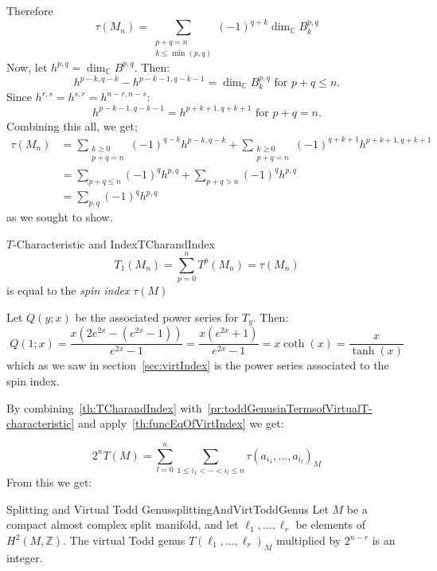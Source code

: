 \documentclass{ut-thesis}
\newenvironment{Proof}[1][]
  {\begin{ProofTcb}[#1]}
  {\end{ProofTcb}}
\begin{document}
\begin{Proof}
  Therefore
  \[
    \tau(M_n) = \sum_{\substack{p+q=n\\k\le \min(p,q)}} (-1)^{q+k} \dim_{\mathbb{C}} B_k^{p,q}
  \]
  Now, let $h^{p,q} = \dim_{\mathbb{C}} B^{p,q}$. Then:
  \[
      h^{p-k,q-k} - h^{p-k-1,q-k-1} = \dim_{\mathbb{C}} B_k^{p,q} \text{ for } p+q \leq n.
  \]
  Since $h^{r,s} = h^{s,r} = h^{n-r,n-s}$:
  \[
      h^{p-k-1,q-k-1} = h^{p+k+1,q+k+1} \text{ for } p+q=n.
  \]
  Combining this all, we get;
  \begin{align*}
    \tau(M_n) &= \sum_{\substack{k \geq 0 \\ p+q=n}} (-1)^{q-k}h^{p-k,q-k} + \sum_{\substack{k \geq 0 \\ p+q=n}} (-1)^{q+k+1}h^{p+k+1,q+k+1} \\
      &= \sum_{p+q \leq n} (-1)^qh^{p,q} + \sum_{p+q>n} (-1)^qh^{p,q} \\
      &= \sum_{p,q} (-1)^qh^{p,q}
  \end{align*}
  as we sought to show.
\end{Proof}

\begin{thm}{$T$-Characteristic and Index}{TCharandIndex}
\[
  T_{1}(M_n) = \sum_{p=0}^n  T^p(M_n) = \tau(M_n)
\]
is equal to the \emph{spin index} $\tau(M)$%
\end{thm}

\begin{Proof}
  Let $Q(y;x)$ be the associated power series for $T_y$. Then:
  \[
    Q(1;x) = \frac{x(2e^{2x} - (e^{2x} - 1))}{e^{2x} - 1} = \frac{x(e^{2x} + 1)}{e^{2x} - 1} = x\coth(x) = \frac{x}{\tanh(x)}
\]
which as we saw in section~\ref{sec:virtIndex} is the power series associated to the spin index.
\end{Proof}

By combining~\cref{th:TCharandIndex} with~\cref{pr:toddGenusinTermsofVirtualT-characteristic} and
apply~\cref{th:funcEqOfVirtIndex} we get:

\[
2^n T(M) = \sum_{l=0}^n \sum_{1\leq i_1<\cdots<i_l\leq n} \tau(a_{i_1},\ldots,a_{i_l})_M
\]
From this we get:

\begin{thm}{Splitting and Virtual Todd Genus}{splittingAndVirtToddGenus}
Let $M$ be a compact almost complex split manifold, and let $\ell_1,\ldots,\ell_r$ be elements of
$H^2(M,\mathbb{Z})$. The virtual Todd genus $T(\ell_1,\ldots,\ell_r)_M$ multiplied by $2^{n-r}$ is an
integer.
\end{thm}
\end{document}
